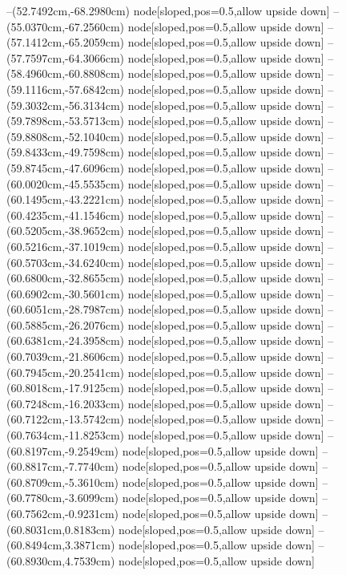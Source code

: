 --(52.7492cm,-68.2980cm) node[sloped,pos=0.5,allow upside down]{\ArrowIn}
--(55.0370cm,-67.2560cm) node[sloped,pos=0.5,allow upside down]{\ArrowIn}
--(57.1412cm,-65.2059cm) node[sloped,pos=0.5,allow upside down]{\ArrowIn}
--(57.7597cm,-64.3066cm) node[sloped,pos=0.5,allow upside down]{\ArrowIn}
--(58.4960cm,-60.8808cm) node[sloped,pos=0.5,allow upside down]{\ArrowIn}
--(59.1116cm,-57.6842cm) node[sloped,pos=0.5,allow upside down]{\ArrowIn}
--(59.3032cm,-56.3134cm) node[sloped,pos=0.5,allow upside down]{\ArrowIn}
--(59.7898cm,-53.5713cm) node[sloped,pos=0.5,allow upside down]{\ArrowIn}
--(59.8808cm,-52.1040cm) node[sloped,pos=0.5,allow upside down]{\ArrowIn}
--(59.8433cm,-49.7598cm) node[sloped,pos=0.5,allow upside down]{\ArrowIn}
--(59.8745cm,-47.6096cm) node[sloped,pos=0.5,allow upside down]{\ArrowIn}
--(60.0020cm,-45.5535cm) node[sloped,pos=0.5,allow upside down]{\ArrowIn}
--(60.1495cm,-43.2221cm) node[sloped,pos=0.5,allow upside down]{\ArrowIn}
--(60.4235cm,-41.1546cm) node[sloped,pos=0.5,allow upside down]{\ArrowIn}
--(60.5205cm,-38.9652cm) node[sloped,pos=0.5,allow upside down]{\ArrowIn}
--(60.5216cm,-37.1019cm) node[sloped,pos=0.5,allow upside down]{\ArrowIn}
--(60.5703cm,-34.6240cm) node[sloped,pos=0.5,allow upside down]{\ArrowIn}
--(60.6800cm,-32.8655cm) node[sloped,pos=0.5,allow upside down]{\ArrowIn}
--(60.6902cm,-30.5601cm) node[sloped,pos=0.5,allow upside down]{\ArrowIn}
--(60.6051cm,-28.7987cm) node[sloped,pos=0.5,allow upside down]{\ArrowIn}
--(60.5885cm,-26.2076cm) node[sloped,pos=0.5,allow upside down]{\ArrowIn}
--(60.6381cm,-24.3958cm) node[sloped,pos=0.5,allow upside down]{\ArrowIn}
--(60.7039cm,-21.8606cm) node[sloped,pos=0.5,allow upside down]{\ArrowIn}
--(60.7945cm,-20.2541cm) node[sloped,pos=0.5,allow upside down]{\ArrowIn}
--(60.8018cm,-17.9125cm) node[sloped,pos=0.5,allow upside down]{\ArrowIn}
--(60.7248cm,-16.2033cm) node[sloped,pos=0.5,allow upside down]{\ArrowIn}
--(60.7122cm,-13.5742cm) node[sloped,pos=0.5,allow upside down]{\ArrowIn}
--(60.7634cm,-11.8253cm) node[sloped,pos=0.5,allow upside down]{\ArrowIn}
--(60.8197cm,-9.2549cm) node[sloped,pos=0.5,allow upside down]{\ArrowIn}
--(60.8817cm,-7.7740cm) node[sloped,pos=0.5,allow upside down]{\ArrowIn}
--(60.8709cm,-5.3610cm) node[sloped,pos=0.5,allow upside down]{\ArrowIn}
--(60.7780cm,-3.6099cm) node[sloped,pos=0.5,allow upside down]{\ArrowIn}
--(60.7562cm,-0.9231cm) node[sloped,pos=0.5,allow upside down]{\ArrowIn}
--(60.8031cm,0.8183cm) node[sloped,pos=0.5,allow upside down]{\ArrowIn}
--(60.8494cm,3.3871cm) node[sloped,pos=0.5,allow upside down]{\ArrowIn}
--(60.8930cm,4.7539cm) node[sloped,pos=0.5,allow upside down]{\ArrowIn}
